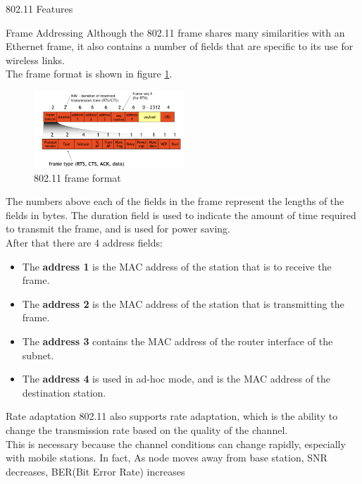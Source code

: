 \begin{section}{802.11 Features}
  \begin{subsection}{Frame Addressing}
    Although the 802.11 frame shares many similarities with an Ethernet frame, it also contains a 
    number of fields that are specific to its use for wireless links.\\
    The frame format is shown in figure \ref{fig:80211 frame format}.
    \begin{figure}[h]
      \centering
      \includegraphics[width=0.5\textwidth]{img/wireless/802.11 frame.png.png}
      \caption{802.11 frame format}
      \label{fig:80211 frame format}
    \end{figure}
  \end{subsection}
  The numbers above each of the fields in the frame represent the lengths of the fields in bytes.
  The duration field is used to indicate the amount of time required to transmit the frame, and is 
  used for power saving.\\
  After that there are 4 address fields:
  \begin{itemize}
    \item The \textbf{address 1} is the MAC address of the station that is to receive the frame.
    \item The \textbf{address 2} is the MAC address of the station that is transmitting 
      the frame.
    \item The \textbf{address 3} contains the MAC address of the router interface of the subnet.
    \item The \textbf{address 4} is used in ad-hoc mode, and is the MAC address of the 
      destination station.
  \end{itemize}
  \begin{subsection}{Rate adaptation}
    802.11 also supports rate adaptation, which is the ability to change the transmission rate 
    based on the quality of the channel.\\
    This is necessary because the channel conditions can change rapidly, especially with mobile
    stations. In fact, As node moves away from base station, SNR decreases, BER(Bit Error Rate) increases

\end{subsection}
\end{section}
